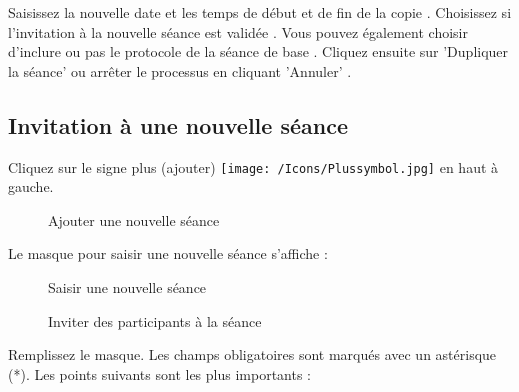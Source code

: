 Saisissez la nouvelle date et les temps de début et de fin de la copie . Choisissez si l'invitation à la nouvelle séance est validée . Vous pouvez également choisir d'inclure ou pas le protocole de la séance de base . Cliquez ensuite sur 'Dupliquer la séance'  ou arrêter le processus en cliquant 'Annuler' .

\vspace{\baselineskip}



\subsection{Invitation à une nouvelle séance}
\label{bkm:Ref434828480}

Cliquez sur le signe plus (ajouter) \texttt{[image: /Icons/Plussymbol.jpg]}  en haut à gauche.

\vspace{\baselineskip}

\begin{figure}[H]
\caption{Ajouter une nouvelle séance}
\end{figure}


Le masque pour saisir une nouvelle séance s'affiche :

\begin{figure}[H]
\caption{Saisir une nouvelle séance}
\end{figure}

\begin{figure}[H]
\caption{Inviter des participants à la séance}
\end{figure}

Remplissez le masque. Les champs obligatoires sont marqués avec un astérisque (*). Les points suivants sont les plus importants :

